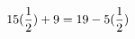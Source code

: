 \documentclass[preview]{standalone}
\begin{document}
\begin{align*}
\special{dvisvgm:raw <g id='unique000'>}15 (\frac{1}{2}) + 9 = 19 - 5 (\frac{1}{2})\special{dvisvgm:raw </g>}
\end{align*}
\end{document}
